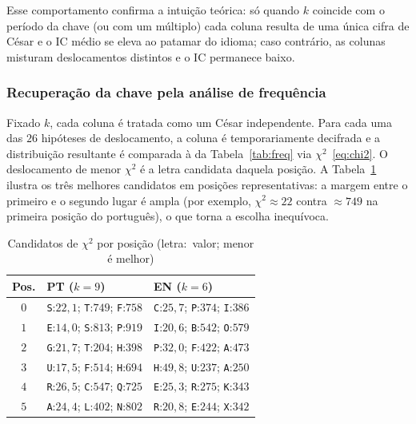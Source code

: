 \documentclass[conference]{IEEEtran}
\begin{document}
Esse comportamento confirma a intuição teórica: só quando $k$ coincide com o
período da chave (ou com um múltiplo) cada coluna resulta de uma única cifra
de César e o IC médio se eleva ao patamar do idioma; caso contrário, as
colunas misturam deslocamentos distintos e o IC permanece baixo.

\subsubsection{Recuperação da chave pela análise de frequência}
Fixado $k$, cada coluna é tratada como um César independente. Para cada uma
das $26$ hipóteses de deslocamento, a coluna é temporariamente decifrada e a
distribuição resultante é comparada à da Tabela~\ref{tab:freq} via
$\chi^2$~\eqref{eq:chi2}. O deslocamento de menor $\chi^2$ é a letra candidata
daquela posição. A Tabela~\ref{tab:chi2} ilustra os três melhores candidatos
em posições representativas: a margem entre o primeiro e o segundo lugar é
ampla (por exemplo, $\chi^2 \approx 22$ contra $\approx 749$ na primeira
posição do português), o que torna a escolha inequívoca.

\begin{table}[htbp]
\caption{Candidatos de $\chi^2$ por posição (letra:~valor; menor é melhor)}
\label{tab:chi2}
\centering
\footnotesize
\begin{tabular}{@{}cll@{}}
\toprule
\textbf{Pos.} & \textbf{PT ($k{=}9$)} & \textbf{EN ($k{=}6$)} \\
\midrule
$0$ & \texttt{S}:$22{,}1$; \texttt{T}:$749$; \texttt{F}:$758$
    & \texttt{C}:$25{,}7$; \texttt{P}:$374$; \texttt{I}:$386$ \\
$1$ & \texttt{E}:$14{,}0$; \texttt{S}:$813$; \texttt{P}:$919$
    & \texttt{I}:$20{,}6$; \texttt{B}:$542$; \texttt{O}:$579$ \\
$2$ & \texttt{G}:$21{,}7$; \texttt{T}:$204$; \texttt{H}:$398$
    & \texttt{P}:$32{,}0$; \texttt{F}:$422$; \texttt{A}:$473$ \\
$3$ & \texttt{U}:$17{,}5$; \texttt{F}:$514$; \texttt{H}:$694$
    & \texttt{H}:$49{,}8$; \texttt{U}:$237$; \texttt{A}:$250$ \\
$4$ & \texttt{R}:$26{,}5$; \texttt{C}:$547$; \texttt{Q}:$725$
    & \texttt{E}:$25{,}3$; \texttt{R}:$275$; \texttt{K}:$343$ \\
$5$ & \texttt{A}:$24{,}4$; \texttt{L}:$402$; \texttt{N}:$802$
    & \texttt{R}:$20{,}8$; \texttt{E}:$244$; \texttt{X}:$342$ \\
\bottomrule
\end{tabular}
\end{table}
\end{document}
